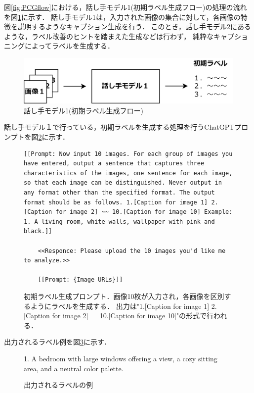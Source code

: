 \documentclass[a4paper,11pt]{jreport}
\begin{document}
図\ref{fig:PCGflow}における，話し手モデル1(初期ラベル生成フロー)の処理の流れを図\ref{fig:PCGspeaker1}に示す．
話し手モデル1は，入力された画像の集合に対して，各画像の特徴を説明するようなキャプション生成を行う．
このとき，話し手モデル2にあるような，ラベル改善のヒントを踏まえた生成などは行わず，
純粋なキャプショニングによってラベルを生成する．

\begin{figure}[H]
	\centering
	\includegraphics[width=0.8\linewidth]{figures/PCGspeaker1.png}
	\caption{話し手モデル1(初期ラベル生成フロー)}
	\label{fig:PCGspeaker1}
\end{figure}

話し手モデル１で行っている，初期ラベルを生成する処理を行うChatGPTプロンプトを図\ref{fig:prompt_speaker1}に示す．


\begin{figure}[h]
  \centering
  \begin{mdframed}
  \begin{lstlisting}[style=chatgptstyle]
    [[Prompt: Now input 10 images. For each group of images you have entered, output a sentence that captures three characteristics of the images, one sentence for each image, so that each image can be distinguished. Never output in any format other than the specified format. The output format should be as follows. 1.[Caption for image 1] 2.[Caption for image 2] ~~ 10.[Caption for image 10] Example: 1. A living room, white walls, wallpaper with pink and black.]]

    <<Responce: Please upload the 10 images you'd like me to analyze.>>

    [[Prompt: {Image URLs}]]
  \end{lstlisting}
  \end{mdframed}
  \caption{初期ラベル生成プロンプト．画像10枚が入力され，各画像を区別するようにラベルを生成する．
  出力は"1.[Caption for image 1] 2.[Caption for image 2] ~~ 10.[Caption for image 10]"の形式で行われる．}
  \label{fig:prompt_speaker1}
\end{figure}

出力されるラベル例を図\ref{fig:firstlabel_example}に示す．

\begin{figure}[H]
  \begin{mdframed}[linewidth=1pt]
    1. A bedroom with large windows offering a view, a cozy sitting area, and a neutral color palette.
  \end{mdframed}
  \caption{出力されるラベルの例}
  \label{fig:firstlabel_example}
\end{figure}
\end{document}
